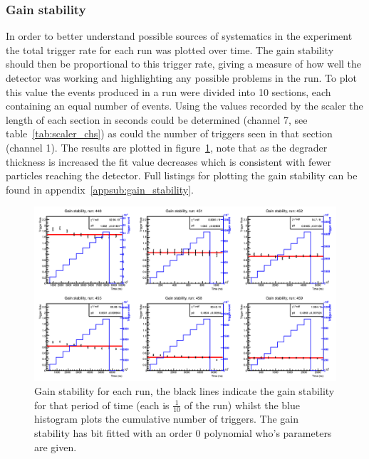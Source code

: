 \subsubsection{Gain stability} %
\label{sub:gain_stability}
In order to better understand possible sources of systematics in the experiment the total trigger rate for each run was plotted over time. The gain stability should then be proportional to this trigger rate, giving a measure of how well the detector was working and highlighting any possible problems in the run. To plot this value the events produced in a run were divided into 10 sections, each containing an equal number of events. Using the values recorded by the scaler the length of each section in seconds could be determined (channel 7, see table~\ref{tab:scaler_chs}) as could the number of triggers seen in that section (channel 1). The results are plotted in figure~\ref{fig:gain_stability}, note that as the degrader thickness is increased the fit value decreases which is consistent with fewer particles reaching the detector. Full listings for plotting the gain stability can be found in appendix~\ref{appsub:gain_stability}.
%

\begin{figure}
      \centering
          \includegraphics[width=\textwidth]{images/momentum_spectrum/gain_stability.png}
      \caption{Gain stability for each run, the black lines indicate the gain stability for that period of time (each is  \(\frac{1}{10}\) of the run) whilst the blue histogram plots the cumulative number of triggers. The gain stability has bit fitted with an order 0 polynomial who's parameters are given.}
      \label{fig:gain_stability}
\end{figure}

